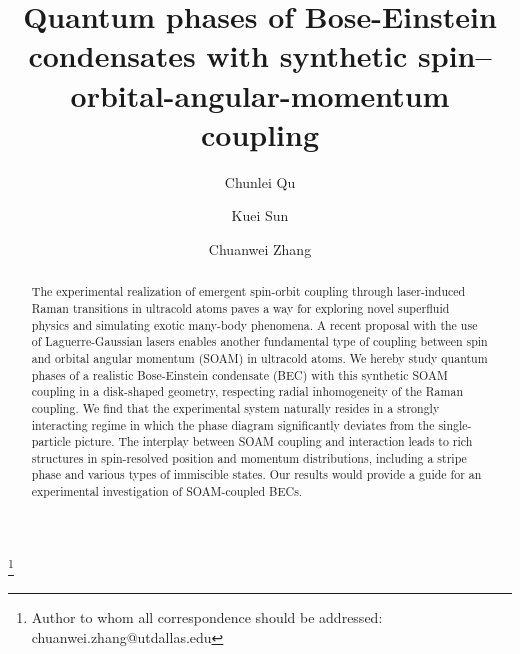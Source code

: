 \documentclass[twocolumn,pra,unsortedaddress,showpacs,floatfix,citeautoscript,nofootinbib]{revtex4-1}
\begin{document}
\title{Quantum phases of Bose-Einstein condensates with synthetic spin--orbital-angular-momentum coupling}
\author{Chunlei Qu}
\author{Kuei Sun}
\author{Chuanwei Zhang}
\thanks{Author to whom all correspondence should be addressed: chuanwei.zhang@utdallas.edu}

\begin{abstract}
The experimental realization of emergent spin-orbit coupling
through laser-induced Raman transitions in ultracold atoms paves a
way for exploring novel superfluid physics and simulating exotic
many-body phenomena. A recent proposal with the use of
Laguerre-Gaussian lasers enables another fundamental type of
coupling between spin and orbital angular momentum (SOAM) in
ultracold atoms. We hereby study quantum phases of a realistic
Bose-Einstein condensate (BEC) with this synthetic SOAM coupling
in a disk-shaped geometry, respecting radial inhomogeneity of the
Raman coupling. We find that the experimental system naturally
resides in a strongly interacting regime in which the phase
diagram significantly deviates from the single-particle picture.
The interplay between SOAM coupling and interaction leads to rich
structures in spin-resolved position and momentum distributions,
including a stripe phase and various types of immiscible states.
Our results would provide a guide for an experimental
investigation of SOAM-coupled BECs.
\end{abstract}

 \maketitle

\vspace{-0.5cm}
\end{document}
